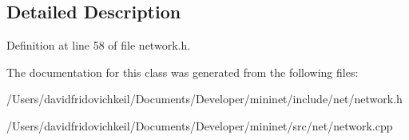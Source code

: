 \subsection{Detailed Description}


Definition at line 58 of file network.\+h.



The documentation for this class was generated from the following files\+:\begin{DoxyCompactItemize}
\item 
/\+Users/davidfridovichkeil/\+Documents/\+Developer/mininet/include/net/network.\+h\item 
/\+Users/davidfridovichkeil/\+Documents/\+Developer/mininet/src/net/network.\+cpp\end{DoxyCompactItemize}
